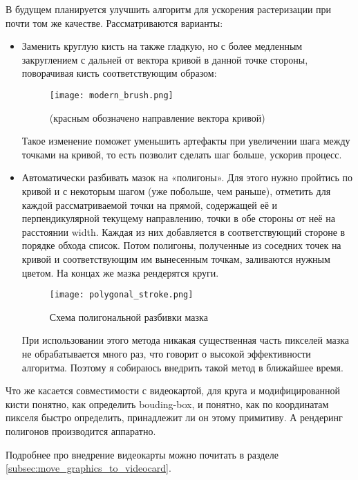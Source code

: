 В будущем планируется улучшить алгоритм для ускорения растеризации при почти том же качестве.
Рассматриваются варианты:
\begin{itemize}
    \item Заменить круглую кисть на также гладкую, но с более медленным закруглением с дальней от вектора кривой в данной точке стороны, поворачивая кисть соответствующим образом:
    \begin{figure}[h!]
        \centering
        \texttt{[image: modern\_brush.png]}
        \caption{(красным обозначено направление вектора кривой)}
        \label{fig:modern_brush}
    \end{figure}
    Такое изменение поможет уменьшить артефакты при увеличении шага между точками на кривой, то есть позволит сделать шаг больше, ускорив процесс.

    \item Автоматически разбивать мазок на «полигоны».
                Для этого нужно пройтись по кривой и с некоторым шагом (уже побольше, чем раньше),
                отметить для каждой рассматриваемой точки на прямой, содержащей её и перпендикулярной текущему направлению, точки в обе стороны от неё на расстоянии width.
                Каждая из них добавляется в соответствующий стороне в порядке обхода список.
                Потом полигоны, полученные из соседних точек на кривой и соответствующим им вынесенным точкам, заливаются нужным цветом.
                На концах же мазка рендерятся круги.

    \begin{figure}[h!]
        \centering
        \texttt{[image: polygonal\_stroke.png]}
        \caption{Схема полигональной разбивки мазка}
        \label{fig:polygonal_stroke}
    \end{figure}

    При использовании этого метода никакая существенная часть пикселей мазка не обрабатывается много раз, что говорит о высокой эффективности алгоритма.
    Поэтому я собираюсь внедрить такой метод в ближайшее время.
\end{itemize}

Что же касается совместимости с видеокартой,
для круга и модифицированной кисти понятно, как определить bouding-box,
и понятно, как по координатам пикселя быстро определить, принадлежит ли он этому примитиву.
А рендеринг полигонов производится аппаратно.

Подробнее про внедрение видеокарты можно почитать в разделе \ref{subsec:move_graphics_to_videocard}.

